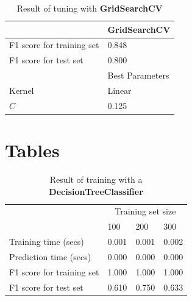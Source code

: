 \documentclass[12pt]{article}
\begin{document}
\setlength{\extrarowheight}{1.5pt}
\begin{table}[!htbp]
\caption{Result of tuning with \textbf{GridSearchCV}} %
\centering %
\begin{tabular}{|p{4cm}||p{4cm}|} %
\hline %
& GridSearchCV\\[0.5ex]
\hline %

F1 score for training set     &0.848\\
F1 score for test set         &0.800\\

\hline %
& Best Parameters \\[1ex]
\hline %

Kernel & Linear\\
$C$ & 0.125\\
\hline %
\end{tabular}
\label{tunedGridSearch}
\end{table}









\section*{Tables}

\setlength{\extrarowheight}{1.5pt}
\begin{table}[!htbp]
\caption{Result of training with a \textbf{DecisionTreeClassifier}} %
\centering %
\begin{tabular}{|p{6cm}|p{1.5cm}|p{1.5cm}|p{1.5cm}|} %
\hline %
& \multicolumn{3}{c|}{Training set size}\\[5pt]
\cline{2-4} 
& 100 & 200 & 300\\[0.5ex]
\hline %

Training time (secs)          &0.001 &0.001 &0.002\\
Prediction time (secs)        &0.000 &0.000 &0.000\\
F1 score for training set     &1.000 &1.000 &1.000\\
F1 score for test set         &0.610 &0.750 &0.633\\

\hline %
\end{tabular}
\label{decisionTreeTable}
\end{table}
\end{document}
